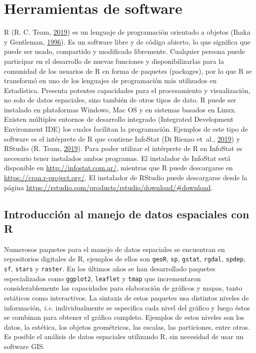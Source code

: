 \documentclass[11pt,b5paper,]{krantz}
\begin{document}
\chapter{Herramientas de software}\label{herramientas-de-software}

R (R. C. Team, \protect\hyperlink{ref-R_Core_Team_2019}{2019}) es un
lenguaje de programación orientado a objetos (Ihaka y Gentleman,
\protect\hyperlink{ref-Ihaka_Gentleman_1996}{1996}). Es un software
libre y de código abierto, lo que significa que puede ser usado,
compartido y modificado libremente. Cualquier persona puede participar
en el desarrollo de nuevas funciones y disponibilizarlas para la
comunidad de los usuarios de R en forma de paquetes (packages), por lo
que R se transformó en uno de los lenguajes de programación más
utilizados en Estadística. Presenta potentes capacidades para el
procesamiento y visualización, no solo de datos espaciales, sino también
de otros tipos de dato. R puede ser instalado en plataformas Windows,
Mac OS y en sistemas basados en Linux. Existen múltiples entornos de
desarrollo integrado (Integrated Development Environment IDE) los cuales
facilitan la programación. Ejemplos de este tipo de software es el
intérprete de R que contiene InfoStat (Di Rienzo et~al.,
\protect\hyperlink{ref-Di_Rienzo_Casanoves_Balzarini_Gonzalez_Tablada_Robledo_2019}{2019})
y RStudio (R. Team, \protect\hyperlink{ref-RStudio_Team_2019}{2019}).
Para poder utilizar el intérprete de R en InfoStat es necesario tener
instalados ambos programas. El instalador de InfoStat está disponible en
\url{http://infostat.com.ar/}, mientras que R puede descargarse en
\url{https://cran.r-project.org/}. El instalador de RStudio puede
descargarse desde la página
\url{https://rstudio.com/products/rstudio/download/\#download}.

\section{Introducción al manejo de datos espaciales con
R}\label{introducciuxf3n-al-manejo-de-datos-espaciales-con-r}

Numerosos paquetes para el manejo de datos espaciales se encuentran en
repositorios digitales de R, ejemplos de ellos son \texttt{geoR},
\texttt{sp}, \texttt{gstat}, \texttt{rgdal}, \texttt{spdep},
\texttt{sf}, \texttt{stars} y \texttt{raster}. En los últimos años se
han desarrollado paquetes especializados como \texttt{ggplot2},
\texttt{leaflet} y \texttt{tmap} que incrementaron considerablemente las
capacidades para elaboración de gráficos y mapas, tanto estáticos como
interactivos. La sintaxis de estos paquetes usa distintos niveles de
información, \emph{i.e.} individualmente se especifica cada nivel del
gráfico y luego éstos se combinan para obtener el gráfico completo.
Ejemplos de estos niveles son los datos, la estética, los objetos
geométricos, las escalas, las particiones, entre otros. Es posible el
análisis de datos espaciales utilizando R, sin necesidad de usar un
software GIS.
\end{document}
